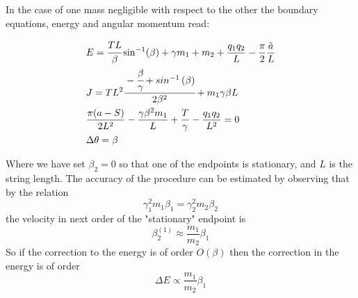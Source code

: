 \documentclass[11pt,a4paper]{article}
\begin{document}
In the case of one mass negligible with respect to the other the boundary equations, energy and angular momentum read:

\begin{subequations}
\label{eq:regge}
\begin{align}
&E=\cfrac{TL}{\beta}\sin^{-1}(\beta)+\gamma m_{1}+m_{2}+\frac{q_{1}q_{2}}{L}-\frac{\pi}{2}\frac{\tilde{a}}{L}\\
&J=TL^2\cfrac{-\cfrac{\beta}{\gamma}+sin^{-1}\left(\beta\right)}{2\beta^2}+m_1 \gamma\beta L\\
&\frac{\pi (a-S)}{2 L^2}-\frac{\gamma\beta^2 m_1}{L}+\frac{T}{\gamma}-\frac{q_1 q_2}{L^2}=0 \\
&\Delta\theta=\beta
\end{align}
\end{subequations}

Where we have set $\beta_2=0$ so that one of the endpoints is stationary, and $L$ is the string length. The accuracy of the procedure can be estimated by observing that by the relation
\begin{equation*}
\gamma_1^2 m_1 \beta_1=\gamma_2^2 m_2 \beta_2
\end{equation*}
the velocity in next order of the "stationary" endpoint is 
\begin{equation}
\beta^{(1)}_2\approx\frac{m_1}{m_2} \beta_1
\end{equation}
So if the correction to the energy is of order $O(\beta)$ then the correction in the energy is of order
\begin{equation*}
\Delta E \propto \frac{m_1}{m_2} \beta_1
\end{equation*}
\end{document}
